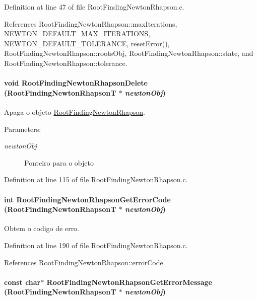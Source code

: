 Definition at line 47 of file RootFindingNewtonRhapson.c.

References RootFindingNewtonRhapson::maxIterations, NEWTON\_\-DEFAULT\_\-MAX\_\-ITERATIONS, NEWTON\_\-DEFAULT\_\-TOLERANCE, resetError(), RootFindingNewtonRhapson::rootsObj, RootFindingNewtonRhapson::state, and RootFindingNewtonRhapson::tolerance.\hypertarget{group____newton_g40efb00500a3157208d224b3942ec915}{
\paragraph[RootFindingNewtonRhapsonDelete]{\setlength{\rightskip}{0pt plus 5cm}void RootFindingNewtonRhapsonDelete ({\bf RootFindingNewtonRhapsonT} $\ast$ {\em newtonObj})}\hfill}
\label{group____newton_g40efb00500a3157208d224b3942ec915}


Apaga o objeto \hyperlink{structRootFindingNewtonRhapson}{RootFindingNewtonRhapson}. 

\begin{Desc}
\item[Parameters:]
\begin{description}
\item[{\em newtonObj}]Ponteiro para o objeto \end{description}
\end{Desc}


Definition at line 115 of file RootFindingNewtonRhapson.c.\hypertarget{group____newton_ga8599365ab3f0770158719cdd32eb5c3}{
\paragraph[RootFindingNewtonRhapsonGetErrorCode]{\setlength{\rightskip}{0pt plus 5cm}int RootFindingNewtonRhapsonGetErrorCode ({\bf RootFindingNewtonRhapsonT} $\ast$ {\em newtonObj})}\hfill}
\label{group____newton_ga8599365ab3f0770158719cdd32eb5c3}


Obtem o codigo de erro. 



Definition at line 190 of file RootFindingNewtonRhapson.c.

References RootFindingNewtonRhapson::errorCode.\hypertarget{group____newton_gcbbd94963ebd3ddbaf6bf4e9ce1c0a1f}{
\paragraph[RootFindingNewtonRhapsonGetErrorMessage]{\setlength{\rightskip}{0pt plus 5cm}const char$\ast$ RootFindingNewtonRhapsonGetErrorMessage ({\bf RootFindingNewtonRhapsonT} $\ast$ {\em newtonObj})}\hfill}
\label{group____newton_gcbbd94963ebd3ddbaf6bf4e9ce1c0a1f}


